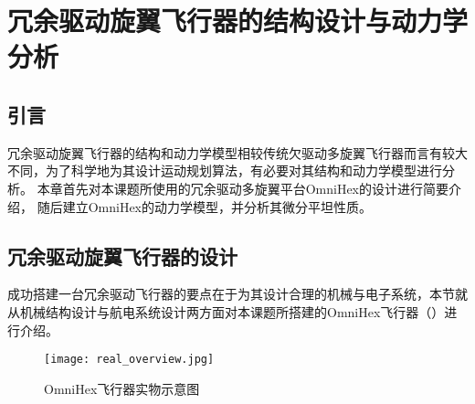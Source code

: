 
\chapter{冗余驱动旋翼飞行器的结构设计与动力学分析}\label{chap:structure_and_dynamics}

\section{引言}\label{sec:intro_2}
冗余驱动旋翼飞行器的结构和动力学模型相较传统欠驱动多旋翼飞行器而言有较大不同，为了科学地为其设计运动规划算法，有必要对其结构和动力学模型进行分析。
本章首先对本课题所使用的冗余驱动多旋翼平台OmniHex的设计进行简要介绍，
随后建立OmniHex的动力学模型，并分析其微分平坦性质。

\section{冗余驱动旋翼飞行器的设计}\label{sec:structure_design}
成功搭建一台冗余驱动飞行器的要点在于为其设计合理的机械与电子系统，本节就从机械结构设计与航电系统设计两方面对本课题所搭建的OmniHex飞行器（）进行介绍。
\begin{figure}[ht]
    \centering
    \texttt{[image: real\_overview.jpg]}
    \caption{OmniHex飞行器实物示意图}
    \label{fig:real_overview}
\end{figure}
